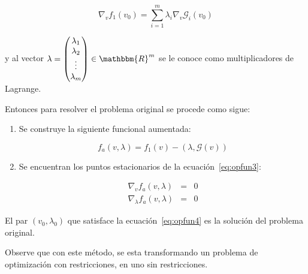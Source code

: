         \begin{equation}
            \nabla_v f_1(v_0) = \sum_{i=1}^m \lambda_i \nabla_v \mathscr{G}_i(v_0)
        \end{equation}

        y al vector $\lambda = \begin{pmatrix} \lambda_1 \\ \lambda_2 \\ \vdots \\ \lambda_m \end{pmatrix} \in \mathbbm{R}^m$ se le conoce como multiplicadores de Lagrange.

        Entonces para resolver el problema original se procede como sigue:

        \begin{enumerate}
            \item Se construye la siguiente funcional aumentada:

            \begin{equation}\label{eq:opfun3}
                f_a(v, \lambda) = f_1(v) - \left( \lambda, \mathscr{G}(v) \right)
            \end{equation}

            \item Se encuentran los puntos estacionarios de la ecuación~\ref{eq:opfun3}:

            \begin{eqnarray}\label{eq:opfun4}
                \nabla_v f_a(v, \lambda) & = & 0 \nonumber \\
                \nabla_\lambda f_a(v, \lambda) & = & 0
            \end{eqnarray}
        \end{enumerate}

        El par $(v_0, \lambda_0)$ que satisface la ecuación~\ref{eq:opfun4} es la solución del problema original.

        Observe que con este método, se esta transformando un problema de optimización con restricciones, en uno sin restricciones.
